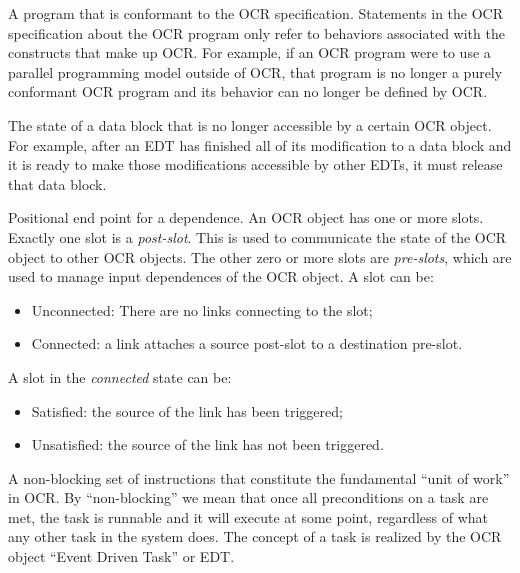 \glossarydefstart
A program that is conformant to the OCR specification. Statements in
the OCR specification about the OCR program only refer to behaviors
associated with the constructs that make up OCR. For example, if an
OCR program were to use a parallel programming model outside of OCR,
that program is no longer a purely conformant OCR program and its
behavior can no longer be defined by OCR.
\glossarydefend

\glossarydefstart
The state of a data block that is no longer accessible by a certain OCR
object. For example, after an EDT has finished all of its
modification to a data block and it is ready to make those
modifications accessible by other EDTs, it must release that data
block.
\glossarydefend

\glossarydefstart
Positional end point for a dependence. An OCR object has one or more
slots. Exactly one slot is a \emph{post-slot}. This is used to
communicate the state of the OCR object to other OCR objects. The
other zero or more slots are \emph{pre-slots}, which are used to manage
input dependences of the OCR object. A slot can be:
\begin{itemize}
\item Unconnected: There are no links connecting to the slot;
\item Connected: a link attaches a source post-slot to a destination pre-slot.
\end{itemize}
A slot in the \emph{connected} state can be:
\begin{itemize}
\item Satisfied: the source of the link has been triggered;
\item Unsatisfied: the source of the link has not been triggered.
\end{itemize}
\glossarydefend

\glossarydefstart
A non-blocking set of instructions that constitute the fundamental
``unit of work'' in OCR.  By ``non-blocking'' we mean that once all
preconditions on a task are met, the task is runnable
and it will execute at some point,
regardless of what any other task in the system does. The concept of
a task is realized by the OCR object ``Event Driven Task'' or EDT.
\glossarydefend

